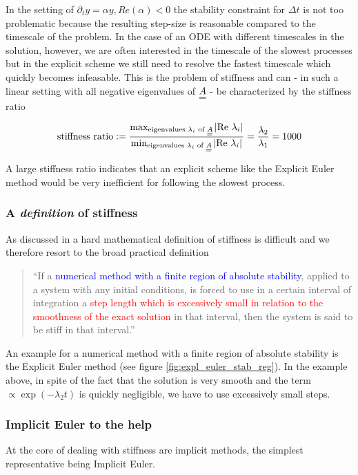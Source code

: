 In the setting of $\partial_t y = \alpha y, Re(\alpha) < 0$ the stability constraint for $\Delta t$ is not too problematic because the resulting step-size is reasonable compared to the timescale of the problem. In the case of an ODE with different timescales in the solution, however, we are often interested in the timescale of the slowest processes but in the explicit scheme we still need to resolve the fastest timescale which quickly becomes infeasable. This is the problem of stiffness and can - in such a linear setting with all negative eigenvalues of $\mat{A}$ - be characterized by the stiffness ratio

\[
  \text{stiffness ratio} := \frac{\max_{\text{eigenvalues } \lambda_i \text{ of } \mat{A}}{\left| \text{Re } \lambda_i \right|}}{\min_{\text{eigenvalues } \lambda_i \text{ of } \mat{A}}{\left| \text{Re } \lambda_i \right|}} = \frac{\lambda_2}{\lambda_1} = 1000
\]

A large stiffness ratio indicates that an explicit scheme like the Explicit Euler method would be very inefficient for following the slowest process.

\subsubsection{A \textit{definition} of stiffness} \label{sec:stiffness_definition}
As discussed in \cite{lambert91} a hard mathematical definition of stiffness is difficult and we therefore resort to the broad practical definition \citep*[chapter 6]{lambert91}

\begin{quote}
  \enquote{If a \textcolor{blue}{numerical method with a finite region of absolute stability}, applied to a system with any initial conditions, is forced to use in a certain interval of integration a \textcolor{red}{step length which is excessively small in relation to the smoothness of the exact solution} in that interval, then the system is said to be stiff in that interval.}
\end{quote}

An example for a numerical method with a finite region of absolute stability is the Explicit Euler method (see figure \ref{fig:expl_euler_stab_reg}). In the example above, in spite of the fact that the solution is very smooth and the term $\propto \exp{\left( -\lambda_2 t\right)}$ is quickly negligible, we have to use excessively small steps.

\subsubsection{Implicit Euler to the help}
\label{sec:implicit_euler}
At the core of dealing with stiffness are implicit methods, the simplest representative being Implicit Euler.

